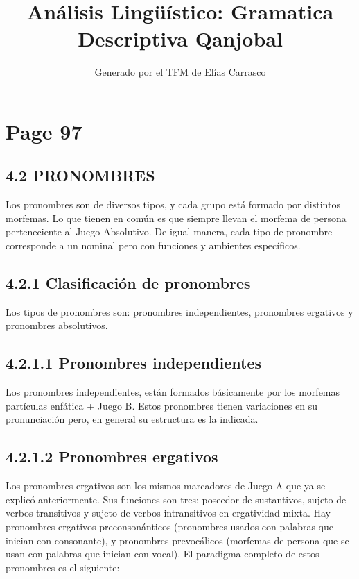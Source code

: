 \documentclass{article}%
\title{Análisis Lingüístico: Gramatica Descriptiva Qanjobal}%
\author{Generado por el TFM de Elías Carrasco}%
\begin{document}
%
\normalsize%
\maketitle%
\section{Page 97}%
\label{sec:Page97}%
\subsection{4.2 PRONOMBRES}%
\label{subsec:4.2PRONOMBRES}%

%
Los pronombres son de diversos tipos, y cada grupo está formado por distintos %
morfemas. Lo que tienen en común es que siempre llevan el morfema de persona %
perteneciente al Juego Absolutivo. De igual manera, cada tipo de pronombre corresponde %
a un nominal pero con funciones y ambientes específicos. %
\subsection{4.2.1 Clasificación de pronombres}%
\label{subsec:4.2.1Clasificacindepronombres}%

%
Los tipos de pronombres son: pronombres independientes, pronombres ergativos y %
pronombres absolutivos. %
\subsection{4.2.1.1 Pronombres independientes}%
\label{subsec:4.2.1.1Pronombresindependientes}%

%
Los pronombres independientes, están formados básicamente por los morfemas %
partículas enfática + Juego B. Estos pronombres tienen variaciones en su %
pronunciación pero, en general su estructura es la indicada. %
\subsection{4.2.1.2 Pronombres ergativos}%
\label{subsec:4.2.1.2Pronombresergativos}%

%
Los pronombres ergativos son los mismos marcadores de Juego A que ya se %
explicó anteriormente. Sus funciones son tres: poseedor de sustantivos, sujeto de %
verbos transitivos y sujeto de verbos intransitivos en ergatividad mixta. Hay %
pronombres ergativos preconsonánticos (pronombres usados con palabras que inician %
con consonante), y pronombres prevocálicos (morfemas de persona que se usan con %
palabras que inician con vocal). El paradigma completo de estos pronombres es el %
siguiente: 

%
\end{document}
